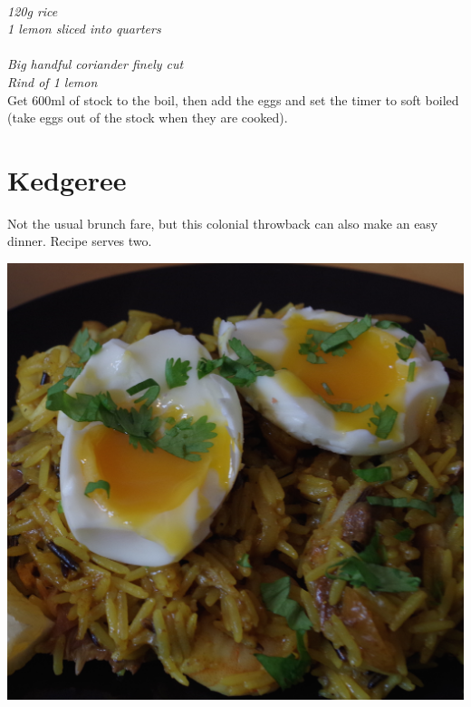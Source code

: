\documentclass{tufte-book}
\begin{document}
\smallskip
{}
\\\emph{120g rice
\\1 lemon sliced into quarters
}
\\
\\\emph{Big handful coriander finely cut
\\Rind of 1 lemon
}
\smallskip
\\Get 600ml of stock to the boil, then add the eggs and set the timer to soft boiled (take eggs out of the stock when they are cooked).


\section{Kedgeree}

Not the usual brunch fare, but this colonial throwback can also make an easy dinner. Recipe serves two.

\begin{marginfigure}%
  \includegraphics[width=\linewidth]{kedgeree.png}
\end{marginfigure}
\end{document}
